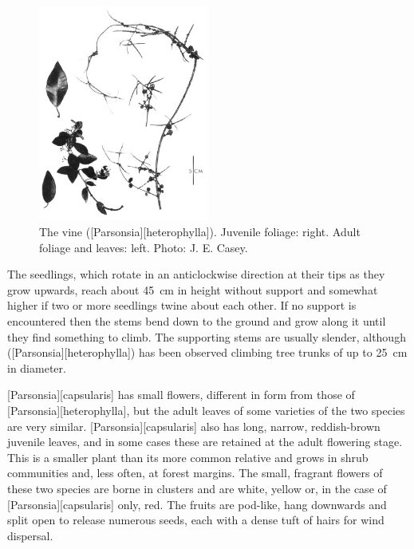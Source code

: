 \begin{figure}
	\includegraphics[width=0.5\textwidth]{graphics/fig_034}
	\centering
	\caption[The vine \emph{Parsonsia heterophylla}]{The vine  ([Parsonsia][heterophylla]). Juvenile foliage: right. Adult foliage and leaves: left. Photo: J. E. Casey.}%
	\label{fig:34parsonsia}
\end{figure}

The seedlings, which rotate in an anticlockwise direction at their tips as they grow upwards, reach about \SI{45}{\centi\metre} in height without support and somewhat higher if two or more seedlings twine about each other.
If no support is encountered then the stems bend down to the ground and grow along it until they find something to climb.
The supporting stems are usually slender, although  ([Parsonsia][heterophylla]) has been observed climbing tree trunks of up to \SI{25}{\centi\metre} in diameter.

[Parsonsia][capsularis] has small flowers, different in form from those of [Parsonsia][heterophylla], but the adult leaves of some varieties of the two species are very similar.
[Parsonsia][capsularis] also has long, narrow, reddish-brown juvenile leaves, and in some cases these are retained at the adult flowering stage.
This is a smaller plant than its more common relative and grows in shrub communities and, less often, at forest margins.
The small, fragrant flowers of these two species are borne in clusters and are white, yellow or, in the case of [Parsonsia][capsularis] only, red.
The fruits are pod-like, hang downwards and split open to release numerous seeds, each with a dense tuft of hairs for wind dispersal.

